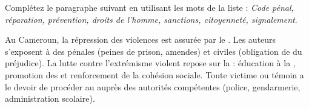 \documentclass[11pt]{article}
\begin{document}
\begin{exercice}
Complétez le paragraphe suivant en utilisant les mots de la liste : \textit{Code pénal, réparation, prévention, droits de l'homme, sanctions, citoyenneté, signalement}.

Au Cameroun, la répression des violences est assurée par le \underline{\hspace{4cm}}. Les auteurs s'exposent à des \underline{\hspace{4cm}} pénales (peines de prison, amendes) et civiles (obligation de \underline{\hspace{4cm}} du préjudice). La lutte contre l'extrémisme violent repose sur la \underline{\hspace{4cm}} : éducation à la \underline{\hspace{4cm}}, promotion des \underline{\hspace{4cm}} et renforcement de la cohésion sociale. Toute victime ou témoin a le devoir de procéder au \underline{\hspace{4cm}} auprès des autorités compétentes (police, gendarmerie, administration scolaire).
\end{exercice}
\end{document}
